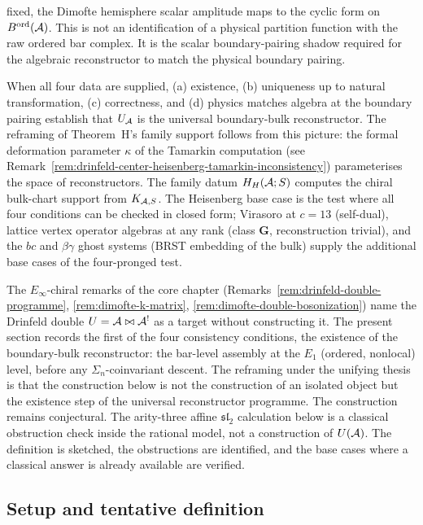 \begin{remark}
\begin{enumerate}[label=\textup{(\alph*)},leftmargin=2em]
fixed, the Dimofte hemisphere scalar amplitude maps to the cyclic form
on $B^{\mathrm{ord}}(\mathcal{A})$. This is not an identification of a physical
partition function with the raw ordered bar complex. It is the scalar
boundary-pairing shadow required for the algebraic reconstructor to
match the physical boundary pairing.
\end{enumerate}
When all four data are supplied, (a) existence, (b) uniqueness up to natural
transformation, (c) correctness, and (d) physics matches
algebra at the boundary pairing establish that $U_{\mathcal{A}}$ is the universal
boundary-bulk reconstructor. The reframing of
Theorem~H's family support follows from this picture: the
formal deformation parameter $\kappa$ of the Tamarkin
computation (see Remark~\ref{rem:drinfeld-center-heisenberg-tamarkin-inconsistency})
parameterises the space of reconstructors.  The family datum
$H_H(\mathcal{A};S)$ computes the chiral bulk-chart support from
$K_{\mathcal{A},S}$. The Heisenberg base case is the test where all four
conditions can be checked in closed form; Virasoro at $c=13$
(self-dual), lattice vertex operator algebras at any rank
(class $\mathbf{G}$, reconstruction trivial), and the $bc$
and $\beta\gamma$ ghost systems (BRST embedding of the bulk)
supply the additional base cases of the four-pronged test.
\end{remark}

The $E_\infty$-chiral remarks of the core chapter
(Remarks~\ref{rem:drinfeld-double-programme},
\ref{rem:dimofte-k-matrix},
\ref{rem:dimofte-double-bosonization})
name the Drinfeld double $U = \mathcal{A} \bowtie \mathcal{A}^!$ as a target
without constructing it. The present section records the
first of the four consistency conditions, the existence of
the boundary-bulk reconstructor: the bar-level assembly at
the $E_1$ (ordered, nonlocal) level, before any
$\Sigma_n$-coinvariant descent. The reframing under the
unifying thesis is that the construction below is not the
construction of an isolated object but the existence step of
the universal reconstructor programme. The construction remains
conjectural. The arity-three affine $\mathfrak{sl}_2$
calculation below is a classical obstruction check inside the
rational model, not a construction of $U(\mathcal{A})$. The definition is
sketched, the obstructions are identified, and the base cases where
a classical answer is already available are verified.

\subsection{Setup and tentative definition}
\label{subsec:drinfeld-e1-definition}

